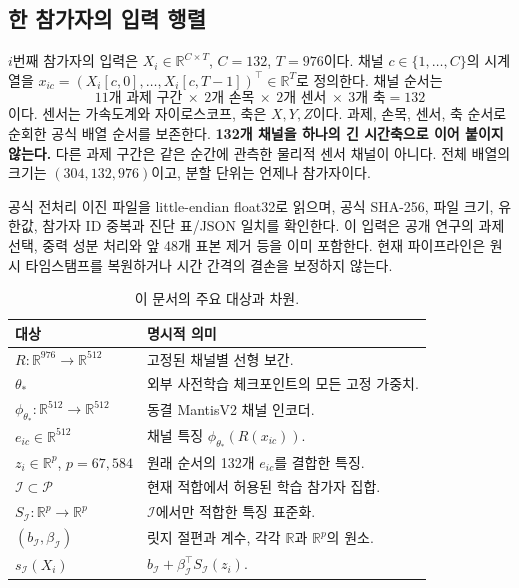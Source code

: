 \documentclass[11pt,a4paper]{article}
\newcommand{\R}{\mathbb R}
\numberwithin{equation}{section}
\begin{document}
\subsection{한 참가자의 입력 행렬}
$i$번째 참가자의 입력은 $X_i\in\R^{C\times T}$,
$C=132$, $T=976$이다.
채널 $c\in\{1,\ldots,C\}$의 시계열을
$x_{ic}=(X_i[c,0],\ldots,X_i[c,T-1])^\top\in\R^T$로 정의한다.
채널 순서는
\begin{equation}
11\text{개 과제 구간}\ \times\ 2\text{개 손목}\ \times\
2\text{개 센서}\ \times\ 3\text{개 축}=132
\end{equation}
이다. 센서는 가속도계와 자이로스코프, 축은 $X,Y,Z$이다.
과제, 손목, 센서, 축 순서로 순회한 공식 배열 순서를 보존한다.
\textbf{132개 채널을 하나의 긴 시간축으로 이어 붙이지 않는다.}
다른 과제 구간은 같은 순간에 관측한 물리적 센서 채널이 아니다.
전체 배열의 크기는 $(304,132,976)$이고, 분할 단위는 언제나 참가자이다.

공식 전처리 이진 파일을 little-endian float32로 읽으며,
공식 SHA-256, 파일 크기, 유한값, 참가자 ID 중복과 진단 표/JSON 일치를 확인한다.
이 입력은 공개 연구의 과제 선택, 중력 성분 처리와 앞 48개 표본 제거 등을 이미 포함한다.
현재 파이프라인은 원시 타임스탬프를 복원하거나 시간 간격의 결손을 보정하지 않는다.

\begin{table}[htbp]\centering\small
\caption{이 문서의 주요 대상과 차원.}\label{tab:objects}
\begin{tabularx}{\linewidth}{@{}lX@{}}\toprule
대상 & 명시적 의미\\\midrule
$R:\R^{976}\to\R^{512}$ & 고정된 채널별 선형 보간.\\
$\theta_*$ & 외부 사전학습 체크포인트의 모든 고정 가중치.\\
$\phi_{\theta_*}:\R^{512}\to\R^{512}$ & 동결 MantisV2 채널 인코더.\\
$e_{ic}\in\R^{512}$ & 채널 특징 $\phi_{\theta_*}(R(x_{ic}))$.\\
$z_i\in\R^p$, $p=67{,}584$ & 원래 순서의 132개 $e_{ic}$를 결합한 특징.\\
$\mathcal I\subset\mathcal P$ & 현재 적합에서 허용된 학습 참가자 집합.\\
$S_{\mathcal I}:\R^p\to\R^p$ & $\mathcal I$에서만 적합한 특징 표준화.\\
$(b_{\mathcal I},\beta_{\mathcal I})$ & 릿지 절편과 계수, 각각 $\R$과 $\R^p$의 원소.\\
$s_{\mathcal I}(X_i)$ & $b_{\mathcal I}+\beta_{\mathcal I}^\top S_{\mathcal I}(z_i)$.\\
\bottomrule\end{tabularx}
\end{table}
\end{document}
